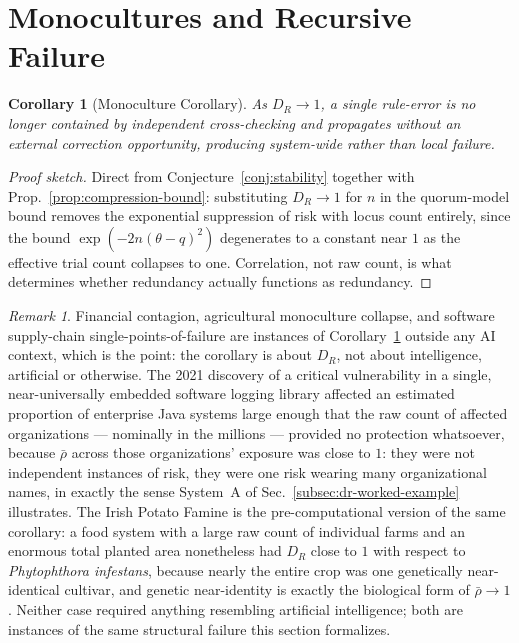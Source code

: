 \documentclass[12pt,a4paper]{article}
\theoremstyle{plain}
\newtheorem{corollary}[theorem]{Corollary}
\theoremstyle{definition}
\theoremstyle{remark}
\newtheorem{remark}[theorem]{Remark}
\newcommand{\DR}{D_R}
\begin{document}
\section{Monocultures and Recursive Failure}
\label{sec:monocultures}

\begin{corollary}[Monoculture Corollary]
\label{cor:monoculture}
As $\DR \to 1$, a single rule-error is no longer contained by independent cross-checking and propagates without an external correction opportunity, producing system-wide rather than local failure.
\end{corollary}

\begin{proof}[Proof sketch]
Direct from Conjecture~\ref{conj:stability} together with Prop.~\ref{prop:compression-bound}: substituting $\DR \to 1$ for $n$ in the quorum-model bound removes the exponential suppression of risk with locus count entirely, since the bound $\exp(-2n(\theta-q)^2)$ degenerates to a constant near $1$ as the effective trial count collapses to one. Correlation, not raw count, is what determines whether redundancy actually functions as redundancy.
\end{proof}

\begin{remark}
Financial contagion, agricultural monoculture collapse, and software supply-chain single-points-of-failure are instances of Corollary~\ref{cor:monoculture} outside any AI context, which is the point: the corollary is about $\DR$, not about intelligence, artificial or otherwise. The 2021 discovery of a critical vulnerability in a single, near-universally embedded software logging library affected an estimated proportion of enterprise Java systems large enough that the raw count of affected organizations — nominally in the millions — provided no protection whatsoever, because $\bar\rho$ across those organizations' exposure was close to $1$: they were not independent instances of risk, they were one risk wearing many organizational names, in exactly the sense System~A of Sec.~\ref{subsec:dr-worked-example} illustrates. The Irish Potato Famine is the pre-computational version of the same corollary: a food system with a large raw count of individual farms and an enormous total planted area nonetheless had $\DR$ close to $1$ with respect to \emph{Phytophthora infestans}, because nearly the entire crop was one genetically near-identical cultivar, and genetic near-identity is exactly the biological form of $\bar\rho \to 1$. Neither case required anything resembling artificial intelligence; both are instances of the same structural failure this section formalizes.
\end{remark}
\end{document}
